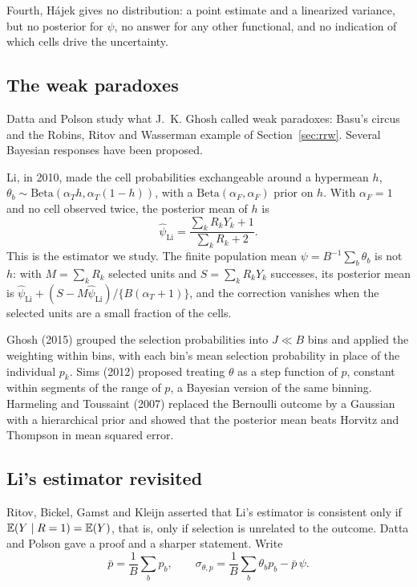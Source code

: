 Fourth, H\'ajek gives no distribution: a point estimate and a linearized variance, but no posterior for $\psi$, no answer for any other functional, and no indication of which cells drive the uncertainty.

\subsection{The weak paradoxes}

Datta and Polson study what J.~K. Ghosh called weak paradoxes: Basu's circus and the Robins, Ritov and Wasserman example of Section~\ref{sec:rrw}. Several Bayesian responses have been proposed.

Li, in 2010, made the cell probabilities exchangeable around a hypermean $h$, $\theta_b \sim \mathrm{Beta}(\alpha_T h, \alpha_T(1 - h))$, with a $\mathrm{Beta}(\alpha_F, \alpha_F)$ prior on $h$. With $\alpha_F = 1$ and no cell observed twice, the posterior mean of $h$ is
\[
\hat\psi_{\mathrm{Li}} = \frac{\sum_k R_kY_k + 1}{\sum_k R_k + 2}.
\]
This is the estimator we study. The finite population mean $\psi = B^{-1}\sum_b \theta_b$ is not $h$: with $M = \sum_k R_k$ selected units and $S = \sum_k R_kY_k$ successes, its posterior mean is $\hat\psi_{\mathrm{Li}} + (S - M\hat\psi_{\mathrm{Li}})/\{B(\alpha_T + 1)\}$, and the correction vanishes when the selected units are a small fraction of the cells.

Ghosh (2015) grouped the selection probabilities into $J \ll B$ bins and applied the weighting within bins, with each bin's mean selection probability in place of the individual $p_k$. Sims (2012) proposed treating $\theta$ as a step function of $p$, constant within segments of the range of $p$, a Bayesian version of the same binning. Harmeling and Toussaint (2007) replaced the Bernoulli outcome by a Gaussian with a hierarchical prior and showed that the posterior mean beats Horvitz and Thompson in mean squared error.

\subsection{Li's estimator revisited}

Ritov, Bickel, Gamst and Kleijn asserted that Li's estimator is consistent only if $\mathbb{E}(Y \mid R = 1) = \mathbb{E}(Y)$, that is, only if selection is unrelated to the outcome. Datta and Polson gave a proof and a sharper statement. Write
\[
\bar p = \frac{1}{B}\sum_b p_b, \qquad \sigma_{\theta,p} = \frac{1}{B}\sum_b \theta_b p_b - \bar p\,\psi.
\]

